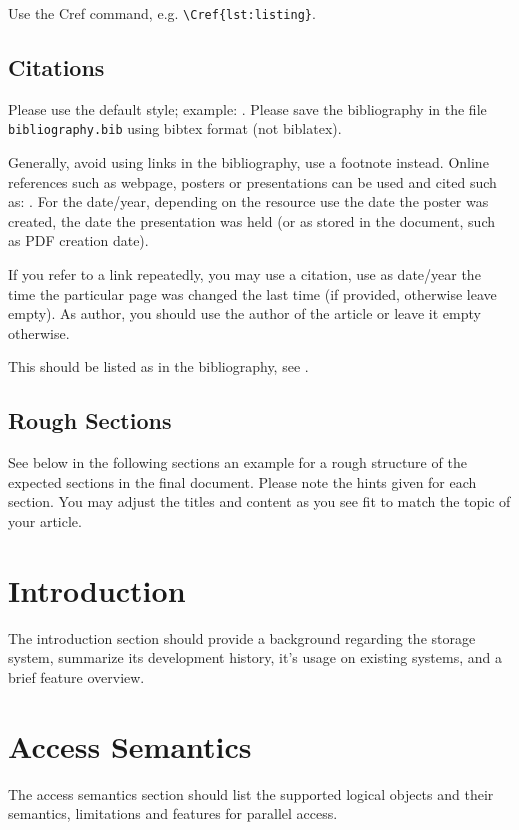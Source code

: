 \documentclass{jhps}
\begin{document}
Use the Cref command, e.g. \verb|\Cref{lst:listing}|.\subsection{Citations}

Please use the default style; example: \cite{misc1998}.
Please save the bibliography in the file \texttt{bibliography.bib} using bibtex format (not biblatex).

Generally, avoid using links in the bibliography, use a footnote instead.
Online references such as webpage, posters or presentations can be used and cited such as: \cite{link20pres, link20post, link20web}.
For the date/year, depending on the resource use the date the poster was created, the date the presentation was held (or as stored in the document, such as PDF creation date).

If you refer to a link repeatedly, you may use a citation, use as date/year the time the particular page was changed the last time (if provided, otherwise leave empty).
As author, you should use the author of the article or leave it empty otherwise.

This should be listed as in the bibliography, see .
\begin{lstfloat}[h]

\end{lstfloat}

\subsection{Rough Sections}
See below in the following sections  an example for a rough structure of the expected sections in the final document.
Please note the hints given for each section. You may adjust the titles and content as you see fit to match the topic of your article.

\section{Introduction} \label{sec:intro}
The introduction section should provide a background regarding the storage system, summarize its development history, it’s usage on existing systems, and a brief feature overview.

\section{Access Semantics} \label{sec:acc_sem}
The access semantics section should list the supported logical objects and their semantics, limitations and features for parallel access.
\end{document}
